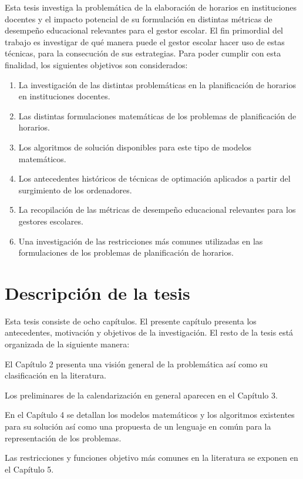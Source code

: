 \documentclass[draft,12pt,headsepline,footsepline,paper=letter]{scrreprt}
\begin{document}
Esta tesis investiga la problemática de la elaboración de horarios en instituciones docentes y el impacto potencial de su formulación en distintas métricas de desempeño educacional relevantes para el gestor escolar.
El fin primordial del trabajo es investigar de qué manera puede el gestor escolar hacer uso de estas técnicas, para la consecución de sus estrategias.
Para poder cumplir con esta finalidad, los siguientes objetivos son considerados:
\begin{enumerate}[1]
\item La investigación de las distintas problemáticas en la planificación de horarios en instituciones docentes.
\item Las distintas formulaciones matemáticas de los problemas de planificación de horarios.
\item Los algoritmos de solución disponibles para este tipo de modelos matemáticos.
\item Los antecedentes históricos de técnicas de optimación aplicados a partir del surgimiento de los ordenadores.
\item La recopilación de las métricas de desempeño educacional relevantes para los gestores escolares.
\item Una investigación de las restricciones más comunes utilizadas en las formulaciones de los problemas de planificación de horarios.
\end{enumerate}

\section{Descripción de la tesis}

Esta tesis consiste de ocho capítulos. El presente capítulo presenta los antecedentes, motivación y objetivos de la investigación. El resto de la tesis está organizada de la siguiente manera:

El Capítulo 2 presenta una visión general de la problemática así como su clasificación en la literatura.

Los preliminares de la calendarización en general aparecen en el Capítulo 3.

En el Capítulo 4 se detallan los modelos matemáticos y los algoritmos existentes para su solución así como una propuesta de un lenguaje en común para la representación de los problemas.

Las restricciones y funciones objetivo más comunes en la literatura se exponen en el Capítulo 5.
\end{document}
